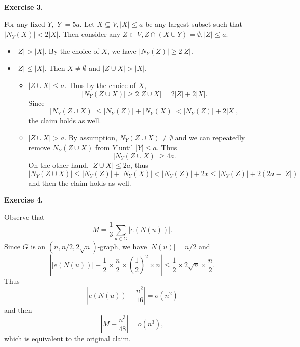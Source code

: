 \documentclass[a4paper]{article}
\newenvironment{exercise}[1]{
	\par
	\noindent\textbf{Exercise #1.}\quad
}{
	\par
	\bigskip
}
\newcommand{\abs}[1]{\left| #1 \right|}
\newcommand{\pbra}[1]{\left( #1 \right)}
\begin{document}
\begin{exercise}{3}
    For any fixed $Y,|Y|=5a$.
    Let $X\subseteq V,|X|\leq a$ be any largest subset such that $|N_Y(X)|<2|X|$.
    Then consider any $Z\subset V,Z\cap\pbra{X\cup Y}=\emptyset,|Z|\leq a$.
    \begin{itemize}
        \item $|Z|>|X|$. By the choice of $X$, we have $|N_Y(Z)|\geq2|Z|$.
        \item $|Z|\leq|X|$. Then $X\neq\emptyset$ and $|Z\cup X|>|X|$. 
            \begin{itemize}
                \item $|Z\cup X|\leq a$.
                    Thus by the choice of $X$,
                    $$
                    |N_Y(Z\cup X)|\geq2|Z\cup X|=2|Z|+2|X|.
                    $$
                    Since 
                    $$
                    |N_Y(Z\cup X)|\leq|N_Y(Z)|+|N_Y(X)|<|N_Y(Z)|+2|X|,
                    $$
                    the claim holds as well.
                \item $|Z\cup X|>a$.
                    By assumption, $N_Y(Z\cup X)\neq\emptyset$ and we can repeatedly remove $N_Y(Z\cup X)$ from $Y$
                    until $|Y|\leq a$. Thus
                    $$
                    |N_Y(Z\cup X)|\geq4a.
                    $$
                    On the other hand, $|Z\cup X|\leq 2a$, thus
                    $$
                    |N_Y(Z\cup X)|\leq|N_Y(Z)|+|N_Y(X)|<|N_Y(Z)|+2x\leq|N_Y(Z)|+2(2a-|Z|)
                    $$
                    and then the claim holds as well.
            \end{itemize}
    \end{itemize}
\end{exercise}

\begin{exercise}{4}
    Observe that
    $$
    M=\frac13\sum_{u\in G}|e(N(u))|.
    $$
    Since $G$ is an $(n,n/2,2\sqrt n)$-graph, we have $|N(u)|=n/2$ and
    $$
    \abs{|e(N(u))|-\frac12\times\frac n2\times\pbra{\frac12}^2\times n}\leq\frac12\times2\sqrt n\times\frac n2.
    $$
    Thus 
    $$
    |e(N(u))-\frac{n^2}{16}|=o(n^2)
    $$
    and then
    $$
    \abs{M-\frac{n^3}{48}}=o(n^3),
    $$
    which is equivalent to the original claim.
\end{exercise}
\end{document}

